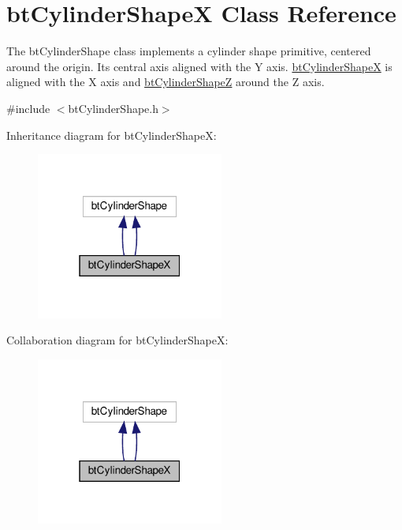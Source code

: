\hypertarget{classbtCylinderShapeX}{}\section{bt\+Cylinder\+ShapeX Class Reference}
\label{classbtCylinderShapeX}


The bt\+Cylinder\+Shape class implements a cylinder shape primitive, centered around the origin. Its central axis aligned with the Y axis. \hyperlink{classbtCylinderShapeX}{bt\+Cylinder\+ShapeX} is aligned with the X axis and \hyperlink{classbtCylinderShapeZ}{bt\+Cylinder\+ShapeZ} around the Z axis.  




{\ttfamily \#include $<$bt\+Cylinder\+Shape.\+h$>$}



Inheritance diagram for bt\+Cylinder\+ShapeX\+:
\nopagebreak
\begin{figure}[H]
\begin{center}
\leavevmode
\includegraphics[width=175pt]{classbtCylinderShapeX__inherit__graph}
\end{center}
\end{figure}


Collaboration diagram for bt\+Cylinder\+ShapeX\+:
\nopagebreak
\begin{figure}[H]
\begin{center}
\leavevmode
\includegraphics[width=175pt]{classbtCylinderShapeX__coll__graph}
\end{center}
\end{figure}
